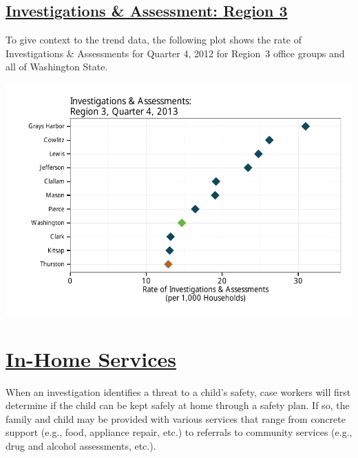 \documentclass{article}\usepackage{graphicx, color}
\makeatletter
\def\maxwidth{ %
  \ifdim\Gin@nat@width>\linewidth
    \linewidth
  \else
    \Gin@nat@width
  \fi
}
\newenvironment{knitrout}{}{} %
\makeatother
\begin{document}
\subsection{
    \href{http://www.partnersforourchildren.org//child-well-being/visualizations/investigations-assessments/trends}
    {Investigations \& Assessment: Region 3}}
To give context to the trend data, the following plot shows the rate of Investigations \& Assessments for Quarter 4, 2012 for Region~3 office groups and all of Washington State.
\nopagebreak[3]
\begin{knitrout}
\color{fgcolor}

{\centering \includegraphics[width=\maxwidth]{figure/ia_context} 

}



\end{knitrout}



\section{\href{http://www.partnersforourchildren.org/child-well-being/visualizations/home-services/trends}
    {In-Home Services}
}
When an investigation identifies a threat to a child's safety, case workers will first determine if the child can be kept safely at home through a safety plan. If so, the family and child may be provided with various services that range from concrete support (e.g., food, appliance repair, etc.) to referrals to community services (e.g., drug and alcohol assessments, etc.).
\end{document}
